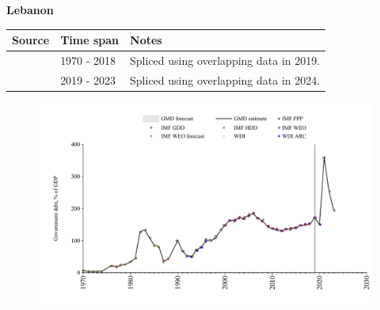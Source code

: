 \documentclass[12pt,a4paper,landscape]{article}
\begin{document}
\begin{adjustbox}{max totalsize={\paperwidth}{\paperheight},center}
\begin{minipage}[t][\textheight][t]{\textwidth}
\vspace*{0.5cm}
{}
\begin{center}
{\Large\bfseries Lebanon}
\end{center}
\vspace{0.5cm}
\begin{table}[H]
\centering
\small
\begin{tabular}{|l|l|l|}
\hline
\textbf{Source} & \textbf{Time span} & \textbf{Notes} \\
\hline
\rowcolor{white}\cite{IMF_GDD}& 1970 - 2018 &Spliced using overlapping data in 2019.\\
\rowcolor{lightgray}\cite{IMF_FPP}& 2019 - 2023 &Spliced using overlapping data in 2024.\\
\hline
\end{tabular}
\end{table}
\begin{figure}[H]
\centering
\includegraphics[width=\textwidth,height=0.6\textheight,keepaspectratio]{graphs/LBN_govdebt_GDP.pdf}
\end{figure}
\end{minipage}
\end{adjustbox}
\end{document}
